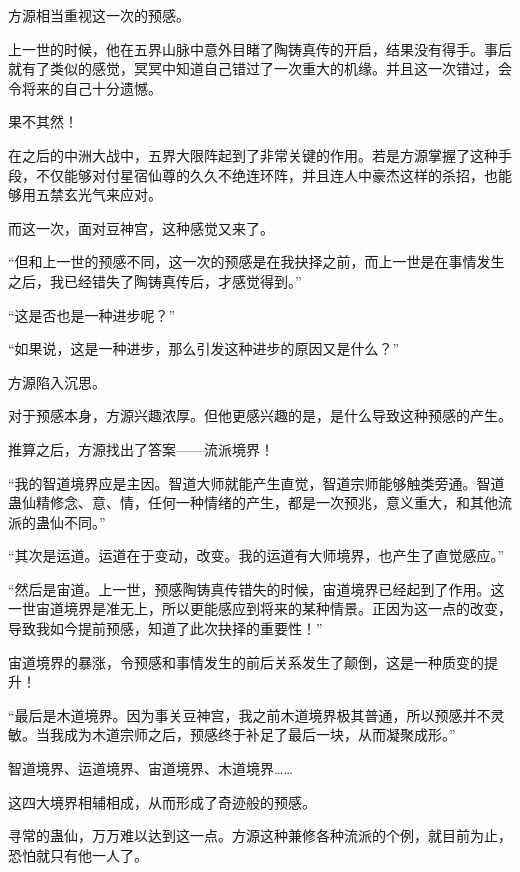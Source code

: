
\begin{this_body}



方源相当重视这一次的预感。

上一世的时候，他在五界山脉中意外目睹了陶铸真传的开启，结果没有得手。事后就有了类似的感觉，冥冥中知道自己错过了一次重大的机缘。并且这一次错过，会令将来的自己十分遗憾。

果不其然！

在之后的中洲大战中，五界大限阵起到了非常关键的作用。若是方源掌握了这种手段，不仅能够对付星宿仙尊的久久不绝连环阵，并且连人中豪杰这样的杀招，也能够用五禁玄光气来应对。

而这一次，面对豆神宫，这种感觉又来了。

“但和上一世的预感不同，这一次的预感是在我抉择之前，而上一世是在事情发生之后，我已经错失了陶铸真传后，才感觉得到。”

“这是否也是一种进步呢？”

“如果说，这是一种进步，那么引发这种进步的原因又是什么？”

方源陷入沉思。

对于预感本身，方源兴趣浓厚。但他更感兴趣的是，是什么导致这种预感的产生。

推算之后，方源找出了答案——流派境界！

“我的智道境界应是主因。智道大师就能产生直觉，智道宗师能够触类旁通。智道蛊仙精修念、意、情，任何一种情绪的产生，都是一次预兆，意义重大，和其他流派的蛊仙不同。”

“其次是运道。运道在于变动，改变。我的运道有大师境界，也产生了直觉感应。”

“然后是宙道。上一世，预感陶铸真传错失的时候，宙道境界已经起到了作用。这一世宙道境界是准无上，所以更能感应到将来的某种情景。正因为这一点的改变，导致我如今提前预感，知道了此次抉择的重要性！”

宙道境界的暴涨，令预感和事情发生的前后关系发生了颠倒，这是一种质变的提升！

“最后是木道境界。因为事关豆神宫，我之前木道境界极其普通，所以预感并不灵敏。当我成为木道宗师之后，预感终于补足了最后一块，从而凝聚成形。”

智道境界、运道境界、宙道境界、木道境界……

这四大境界相辅相成，从而形成了奇迹般的预感。

寻常的蛊仙，万万难以达到这一点。方源这种兼修各种流派的个例，就目前为止，恐怕就只有他一人了。


\end{this_body}
